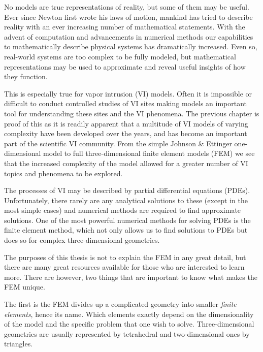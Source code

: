 No models are true representations of reality, but some of them may be useful.
Ever since Newton first wrote his laws of motion, mankind has tried to describe reality with an ever increasing number of mathematical statements.
With the advent of computation and advancements in numerical methods our capabilities to mathematically describe physical systems has dramatically increased.
Even so, real-world systems are too complex to be fully modeled, but mathematical representations may be used to approximate and reveal useful insights of how they function.\par

This is especially true for vapor intrusion (VI) models.
Often it is impossible or difficult to conduct controlled studies of VI sites making models an important tool for understanding these sites and the VI phenomena.
The previous chapter is proof of this as it is readily apparent that a multitude of VI models of varying complexity have been developed over the years, and has become an important part of the scientific VI community.
From the simple Johnson \& Ettinger one-dimensional model to full three-dimensional finite element models (FEM) we see that the increased complexity of the model allowed for a greater number of VI topics and phenomena to be explored.\par

The processes of VI may be described by partial differential equations (PDEs).
Unfortunately, there rarely are any analytical solutions to these (except in the most simple cases) and numerical methods are required to find approximate solutions.
One of the most powerful numerical methods for solving PDEs is the finite element method, which not only allows us to find solutions to PDEs but does so for complex three-dimensional geometries.\par

The purposes of this thesis is not to explain the FEM in any great detail, but there are many great resources available for those who are interested to learn more. %
There are however, two things that are important to know what makes the FEM unique.\par

The first is the FEM divides up a complicated geometry into smaller \textit{finite elements}, hence its name.
Which elements exactly depend on the dimensionality of the model and the specific problem that one wish to solve.
Three-dimensional geometries are usually represented by tetrahedral and two-dimensional ones by triangles.\par

